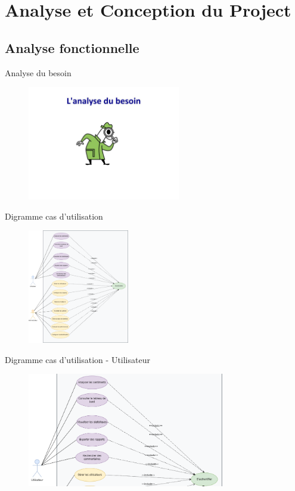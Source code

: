 \section{Analyse et Conception du Project}
\subsection{Analyse fonctionnelle}
\begin{frame}{Analyse du besoin}
    \begin{figure}[H]
        \centering
        \includegraphics[height=5cm]{assets/images/analyse-besoin.jpg}
    \end{figure}

\end{frame}

\begin{frame}{Digramme cas d'utilisation}
    \begin{figure}[H]
        \centering
        \includegraphics[height=5cm]{assets/images/usecase.png}
    \end{figure}
\end{frame}
\begin{frame}{Digramme cas d'utilisation - Utilisateur}
    \begin{figure}[H]
        \centering
        \includegraphics[height=5cm]{assets/images/usecase-user.png}
    \end{figure}
\end{frame}

